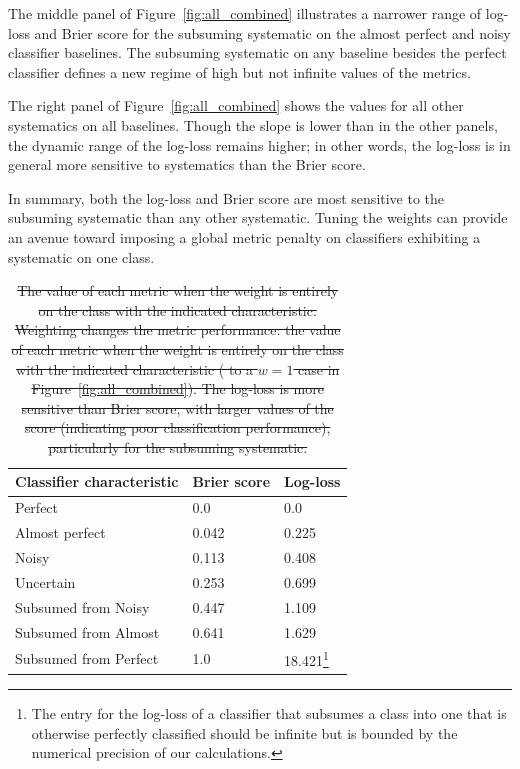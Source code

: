 The middle panel of Figure~\ref{fig:all_combined} illustrates a narrower range of log-loss and Brier score for the subsuming systematic on the almost perfect and noisy classifier baselines.
The subsuming systematic on any baseline besides the perfect classifier defines a new regime of high but not infinite values of the metrics.

The right panel of Figure~\ref{fig:all_combined} shows the values for all other systematics on all baselines.
Though the slope is lower than in the other panels, the dynamic range of the log-loss remains higher; in other words, the log-loss is in general more sensitive to systematics than the Brier score.

In summary, both the log-loss and Brier score are most sensitive to the subsuming systematic than any other systematic.
Tuning the weights can provide an avenue toward imposing a global metric penalty on classifiers exhibiting a systematic on one class.

\begin{table}[]
\begin{tabular}{lll}
Classifier characteristic & Brier score & Log-loss\\
\hline
Perfect & 0.0 & 0.0\\
Almost perfect & 0.042 & 0.225\\
Noisy & 0.113 & 0.408\\
Uncertain & 0.253 & 0.699\\
Subsumed from Noisy & 0.447 & 1.109\\
Subsumed from Almost & 0.641 & 1.629\\
Subsumed from Perfect & 1.0 & 18.421\footnote{The entry for the log-loss of a classifier that subsumes a class into one that is otherwise perfectly classified should be infinite but is bounded by the numerical precision of our calculations.}
\end{tabular}
\caption{\sout{The value of each metric when the weight is entirely on the class with the indicated characteristic.
Weighting changes the metric performance: the value of each metric when the weight is entirely on the class with the indicated characteristic ( to a $w=1$ case in Figure~\ref{fig:all_combined}).
The log-loss is more sensitive than  Brier score, with larger values of the score (indicating poor classification performance), particularly for the subsuming systematic.}
}
\label{tab:extents}
\end{table}


